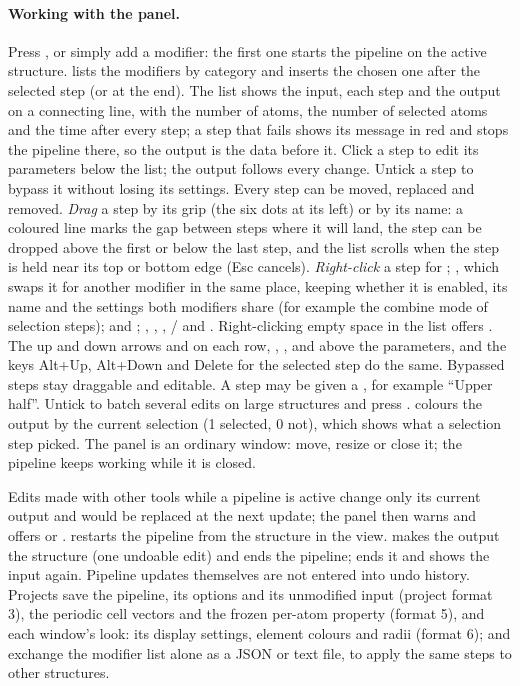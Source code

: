 \paragraph{Working with the panel.} Press , or simply add a modifier: the first one starts the pipeline on the active structure.  lists the modifiers by category and inserts the chosen one after the selected step (or at the end). The list shows the input, each step and the output on a connecting line, with the number of atoms, the number of selected atoms and the time after every step; a step that fails shows its message in red and stops the pipeline there, so the output is the data before it. Click a step to edit its parameters below the list; the output follows every change. Untick a step to bypass it without losing its settings. Every step can be moved, replaced and removed. \emph{Drag} a step by its grip (the six dots at its left) or by its name: a coloured line marks the gap between steps where it will land, the step can be dropped above the first or below the last step, and the list scrolls when the step is held near its top or bottom edge (Esc cancels). \emph{Right-click} a step for ; , which swaps it for another modifier in the same place, keeping whether it is enabled, its name and the settings both modifiers share (for example the combine mode of selection steps);  and ; , , , / and . Right-clicking empty space in the list offers . The up and down arrows and  on each row, , ,  and  above the parameters, and the keys Alt+Up, Alt+Down and Delete for the selected step do the same. Bypassed steps stay draggable and editable. A step may be given a , for example ``Upper half''. Untick  to batch several edits on large structures and press .  colours the output by the current selection (1 selected, 0 not), which shows what a selection step picked. The panel is an ordinary window: move, resize or close it; the pipeline keeps working while it is closed.

Edits made with other tools while a pipeline is active change only its current output and would be replaced at the next update; the panel then warns and offers  or .  restarts the pipeline from the structure in the view.  makes the output the structure (one undoable edit) and ends the pipeline;  ends it and shows the input again. Pipeline updates themselves are not entered into undo history. Projects save the pipeline, its options and its unmodified input (project format 3), the periodic cell vectors and the frozen per-atom property (format 5), and each window's look: its display settings, element colours and radii (format 6);  and  exchange the modifier list alone as a JSON or text file, to apply the same steps to other structures.

